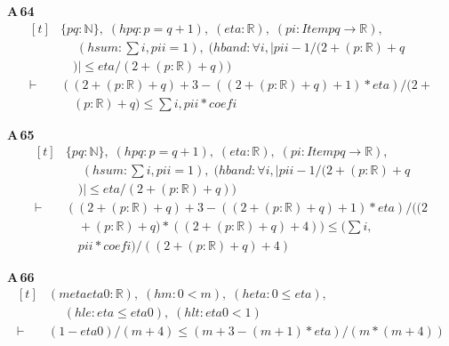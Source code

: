 \noindent\textbf{A\,64}\quad{}
{\footnotesize\[ \begin{aligned}[t]
&\{ \mathit{p} \mathit{q} : \mathbb{N} \},\; (\mathit{hpq} : \mathit{p} = \mathit{q} + 1),\; (\mathit{eta} : \mathbb{R} ),\; (\mathit{pi} : \mathit{Item} \mathit{p} \mathit{q} \to \mathbb{R} ),\\
&\quad \; (\mathit{hsum} : \textstyle\sum \mathit{i}, \mathit{pi} \mathit{i} = 1),\; (\mathit{hband} : \forall \mathit{i}, |\mathit{pi} \mathit{i} - 1 / (2 + (\mathit{p} : \mathbb{R} ) + \mathit{q}\\
&\quad )| \leq \mathit{eta} / (2 + (\mathit{p} : \mathbb{R} ) + \mathit{q}))\\
\vdash\;&((2 + (\mathit{p} : \mathbb{R} ) + \mathit{q}) + 3 - ((2 + (\mathit{p} : \mathbb{R} ) + \mathit{q}) + 1) * \mathit{eta}) / (2 +\\
&\quad (\mathit{p} : \mathbb{R} ) + \mathit{q}) \leq \textstyle\sum \mathit{i}, \mathit{pi} \mathit{i} * \mathit{coef} \mathit{i}
\end{aligned} \]}

\noindent\textbf{A\,65}\quad{}
{\footnotesize\[ \begin{aligned}[t]
&\{ \mathit{p} \mathit{q} : \mathbb{N} \},\; (\mathit{hpq} : \mathit{p} = \mathit{q} + 1),\; (\mathit{eta} : \mathbb{R} ),\; (\mathit{pi} : \mathit{Item} \mathit{p} \mathit{q} \to \mathbb{R} ),\\
&\quad \; (\mathit{hsum} : \textstyle\sum \mathit{i}, \mathit{pi} \mathit{i} = 1),\; (\mathit{hband} : \forall \mathit{i}, |\mathit{pi} \mathit{i} - 1 / (2 + (\mathit{p} : \mathbb{R} ) + \mathit{q}\\
&\quad )| \leq \mathit{eta} / (2 + (\mathit{p} : \mathbb{R} ) + \mathit{q}))\\
\vdash\;&((2 + (\mathit{p} : \mathbb{R} ) + \mathit{q}) + 3 - ((2 + (\mathit{p} : \mathbb{R} ) + \mathit{q}) + 1) * \mathit{eta}) / ((2\\
&\quad + (\mathit{p} : \mathbb{R} ) + \mathit{q}) * ((2 + (\mathit{p} : \mathbb{R} ) + \mathit{q}) + 4)) \leq (\textstyle\sum \mathit{i},\\
&\quad \mathit{pi} \mathit{i} * \mathit{coef} \mathit{i}) / ((2 + (\mathit{p} : \mathbb{R} ) + \mathit{q}) + 4)
\end{aligned} \]}

\noindent\textbf{A\,66}\quad{}
{\footnotesize\[ \begin{aligned}[t]
&(\mathit{m} \mathit{eta} \mathit{eta0} : \mathbb{R} ),\; (\mathit{hm} : 0 < \mathit{m}),\; (\mathit{heta} : 0 \leq \mathit{eta}),\\
&\quad \; (\mathit{hle} : \mathit{eta} \leq \mathit{eta0}),\; (\mathit{hlt} : \mathit{eta0} < 1)\\
\vdash\;&(1 - \mathit{eta0}) / (\mathit{m} + 4) \leq (\mathit{m} + 3 - (\mathit{m} + 1) * \mathit{eta}) / (\mathit{m} * (\mathit{m} + 4))
\end{aligned} \]}

